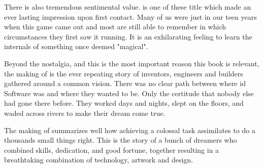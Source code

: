  \par
There is also tremendous sentimental value. \doom{} is one of these title which made an ever lasting impression upon first contact. Many of us were just in our teen years when this game came out and most are still able to remember in which circumstances they first saw it running. It is an exhilarating feeling to learn the internals of something once deemed "magical".\\
\par


Beyond the nostalgia, and this is the most important reason this book is relevant, the making of \doom{} is the ever repeating story of inventors, engineers and builders gathered around a common vision. There was no clear path between where id Software was and where they wanted to be. Only the certitude that nobody else had gone there before. They worked days and nights, slept on the floors, and waded across rivers to make their dream come true.\\
\par
 The making of \doom{} summarizes well how achieving a colossal task assimilates to do a thousands small things right. This is the story of a bunch of dreamers who combined skills, dedication, and good fortune, together resulting in a breathtaking combination of technology, artwork and design.\\
\par



